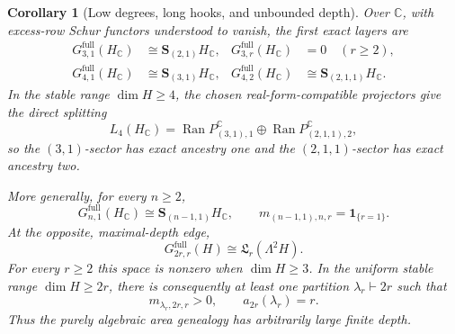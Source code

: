 \documentclass[10pt,reqno]{amsart}
\theoremstyle{plain}
\newtheorem{corollary}[theorem]{Corollary}
\theoremstyle{definition}
\theoremstyle{remark}
\begin{document}
\begin{corollary}[Low degrees, long hooks, and unbounded depth]
\label{cc:cor-low-degree-long-hook}
Over \(\mathbb C\), with excess-row Schur functors understood to vanish,
the first exact layers are
\begin{align}
 G^{\mathrm{full}}_{3,1}(H_{\mathbb C})
 &\cong\mathbf S_{(2,1)}H_{\mathbb C},
 &
 G^{\mathrm{full}}_{3,r}(H_{\mathbb C})&=0\quad(r\geq2),
 \label{cc:eq-degree-three-ancestry}\\
 G^{\mathrm{full}}_{4,1}(H_{\mathbb C})
 &\cong\mathbf S_{(3,1)}H_{\mathbb C},
 &
 G^{\mathrm{full}}_{4,2}(H_{\mathbb C})
 &\cong\mathbf S_{(2,1,1)}H_{\mathbb C}.
 \label{cc:eq-degree-four-ancestry}
\end{align}
In the stable range \(\dim H\geq4\), the chosen real-form-compatible
projectors give the direct splitting
\begin{equation}
 L_4(H_{\mathbb C})
 =
 \operatorname{Ran}P_{(3,1),1}^{\mathbb C}
 \oplus
 \operatorname{Ran}P_{(2,1,1),2}^{\mathbb C},
 \label{cc:eq-degree-four-sector-split}
\end{equation}
so the \((3,1)\)-sector has exact ancestry one and the
\((2,1,1)\)-sector has exact ancestry two.

More generally, for every \(n\geq2\),
\begin{equation}
 G^{\mathrm{full}}_{n,1}(H_{\mathbb C})
 \cong\mathbf S_{(n-1,1)}H_{\mathbb C},
 \qquad
 m_{(n-1,1),n,r}=\mathbf1_{\{r=1\}}.
 \label{cc:eq-long-hook-depth-one}
\end{equation}
At the opposite, maximal-depth edge,
\begin{equation}
 G^{\mathrm{full}}_{2r,r}(H)
 \cong{\mathfrak L}_r(\Lambda^2H).
 \label{cc:eq-maximal-depth-layer}
\end{equation}
For every \(r\geq2\) this space is nonzero when \(\dim H\geq3\).
In the uniform stable range \(\dim H\geq2r\), there is consequently at
least one partition \(\lambda_r\vdash2r\) such that
\begin{equation}
 m_{\lambda_r,2r,r}>0,
 \qquad
 a_{2r}(\lambda_r)=r.
 \label{cc:eq-arbitrarily-deep-schur-sector}
\end{equation}
Thus the purely algebraic area genealogy has arbitrarily large finite
depth.
\end{corollary}
\end{document}
